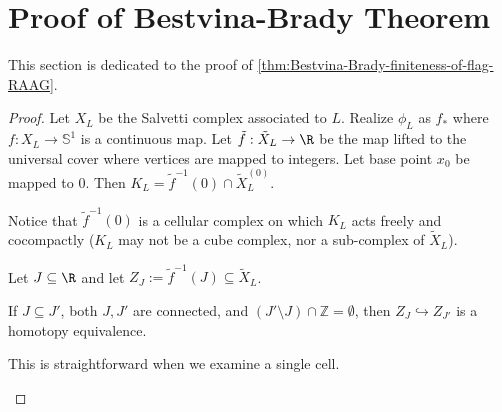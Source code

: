 \section{Proof of Bestvina-Brady Theorem}
\label{sec:morse-theory}

This section is dedicated to the proof of \cref{thm:Bestvina-Brady-finiteness-of-flag-RAAG}. 

\BestvinaBrady*
\begin{proof}
    Let \(X_L\) be the Salvetti complex associated to \(L\).
    Realize \(\phi_L\) as \(f_*\) where \(f:X_L \to \mathbb{S}^1\) is a continuous map. Let \(\tilde f:\tilde X_L \to \R\) be the map lifted to the universal cover where vertices are mapped to integers. Let base point \(x_0\) be mapped to \(0\). Then \(K_L = \tilde f ^{-1}(0)\cap \tilde X_L^{(0)}\).
    
    Notice that \(\tilde f^{-1}(0)\) is a cellular complex on which \(K_L\) acts freely and cocompactly (\(K_L\) may not be a cube complex, nor a sub-complex of \(\tilde X_L\)).

    Let \(J\subseteq \R\) and let \(Z_J:= \tilde f^{-1}(J) \subseteq \tilde X_L\).

    \begin{claim}
        \label{claim:BB-Zj-homptic-equiv}
        If \(J\subseteq J'\), both \(J, J'\) are connected, and \((J'\setminus J)\cap  \mathbb{Z}  = \emptyset\), then \(Z_J \hookrightarrow Z_{J'}\) is a homotopy equivalence.
    \end{claim}
    This is straightforward when we examine a single cell.



    \begin{definition}
        \label{ascending-descending-link}
        
    \end{definition}

\end{proof}